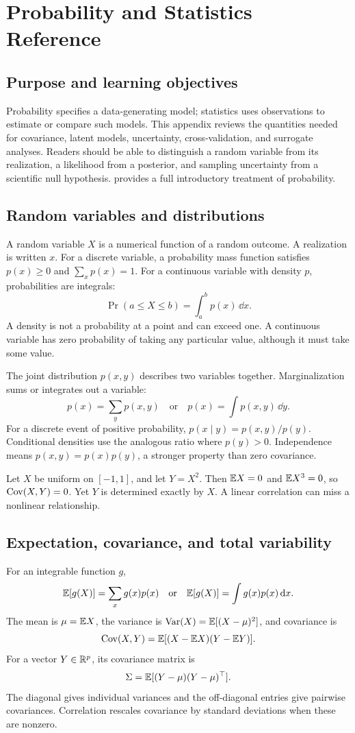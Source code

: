 \chapter{Probability and Statistics Reference}\label{app:c}

\section*{Purpose and learning objectives}
Probability specifies a data-generating model; statistics uses observations to estimate or compare such models. This appendix reviews the quantities needed for covariance, latent models, uncertainty, cross-validation, and surrogate analyses. Readers should be able to distinguish a random variable from its realization, a likelihood from a posterior, and sampling uncertainty from a scientific null hypothesis. \citet{ev_blitzstein2019} provides a full introductory treatment of probability.

\section{Random variables and distributions}
A random variable \(X\) is a numerical function of a random outcome. A realization is written \(x\). For a discrete variable, a probability mass function satisfies \(p(x)\geq0\) and \(\sum_xp(x)=1\). For a continuous variable with density \(p\), probabilities are integrals:
\[
\Pr(a\leq X\leq b)=\int_a^b p(x)\,\dd x.
\]
A density is not a probability at a point and can exceed one. A continuous variable has zero probability of taking any particular value, although it must take some value.

The joint distribution \(p(x,y)\) describes two variables together. Marginalization sums or integrates out a variable:
\[
p(x)=\sum_y p(x,y)
\quad\text{or}\quad
p(x)=\int p(x,y)\,\dd y.
\]
For a discrete event of positive probability, \(p(x\mid y)=p(x,y)/p(y)\). Conditional densities use the analogous ratio where \(p(y)>0\). Independence means \(p(x,y)=p(x)p(y)\), a stronger property than zero covariance.

\begin{example}
Let \(X\) be uniform on \([-1,1]\), and let \(Y=X^2\). Then \(\mathbb{E} X=0\) and \(\mathbb{E} X^3=0\), so \(\operatorname{Cov}(X,Y)=0\). Yet \(Y\) is determined exactly by \(X\). A linear correlation can miss a nonlinear relationship.
\end{example}

\section{Expectation, covariance, and total variability}
For an integrable function \(g\),
\[
\mathbb{E}[g(X)]=\sum_xg(x)p(x)
\quad\text{or}\quad
\mathbb{E}[g(X)]=\int g(x)p(x)\,\mathrm{d} x.
\]
The mean is \(\mu=\mathbb{E} X\), the variance is \(\operatorname{Var}(X)=\mathbb{E}[(X-\mu)^2]\), and covariance is
\[
\operatorname{Cov}(X,Y)=\mathbb{E}[(X-\mathbb{E} X)(Y-\mathbb{E} Y)].
\]
For a vector \(Y\in\mathbb{R}^p\), its covariance matrix is
\[
\Sigma=\mathbb{E}[(Y-\mu)(Y-\mu)^\top].
\]
The diagonal gives individual variances and the off-diagonal entries give pairwise covariances. Correlation rescales covariance by standard deviations when these are nonzero.

